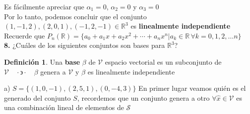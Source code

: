 \documentclass[letterpaper]{article}
\newcommand{\tq}{ \quad \cdot  \backepsilon \cdot \quad }
\renewcommand{\*}{\cdot}
\theoremstyle{definition}
\newtheorem{definition}{Definición}
\begin{document}
Es fácilmente apreciar que $\alpha_{1}=0$, $\alpha_{2}=0$ y $\alpha_{3}=0$\\

Por lo tanto, podemos concluir que el conjunto $ (1,-1,2), (2,0,1),(-1,2,-1) \in \mathbb{R}^{3}$ es \textbf{linealmente independiente}\\

Recuerde que $P_{n}(\mathbb{R}) = \{ a_0 +  a_1x +  a_2x^2 + \cdots +  a_n x^n \big\vert a_k \in \mathbb{R} \,  \forall k = 0,1,2,\dots n\}$
\\

\noindent \textbf{8.} ¿Cuáles de los siguientes conjuntos son bases para $\mathbb{R}^{3}$?
	\begin{definition}
		Una \textbf{base} $ \beta $ de $ \mathcal{V} $ espacio vectorial es un subconjunto de $ \mathcal{V} \tq \beta$  genera a $ \mathcal{V} $ y $ \beta $ es linealmente independiente
	\end{definition}

	a)  $S = \lbrace (1,0,-1),(2,5,1),(0,-4,3) \rbrace$
	En primer lugar veamos quién es el generado del conjunto $ S $, recordemos que un conjunto genera a otro $ \forall \hat{x} \in \mathcal{V} $ es una combinación lineal de elementos de $ \mathcal{S} $ 
	
\end{document}

